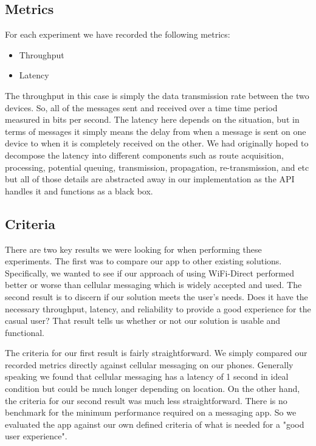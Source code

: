 \documentclass[10pt]{article}
\begin{document}
\subsection{Metrics}

For each experiment we have recorded the following metrics:
\begin{itemize}
    \item Throughput
    \item Latency
\end{itemize}
The throughput in this case is simply the data transmission rate between the two devices. So, all of the messages sent and received over a time time period measured in bits per second. The latency here depends on the situation, but in terms of messages it simply means the delay from when a message is sent on one device to when it is completely received on the other. We had originally hoped to decompose the latency into different components such as route acquisition, processing, potential queuing, transmission, propagation, re-transmission, and etc but all of those details are abstracted away in our implementation as the API handles it and functions as a black box.

\subsection{Criteria}

There are two key results we were looking for when performing these experiments. The first was to compare our app to other existing solutions. Specifically, we wanted to see if our approach of using WiFi-Direct performed better or worse than cellular messaging which is widely accepted and used. The second result is to discern if our solution meets the user's needs. Does it have the necessary throughput, latency, and reliability to provide a good experience for the casual user? That result tells us whether or not our solution is usable and functional.

The criteria for our first result is fairly straightforward. We simply compared our recorded metrics directly against cellular messaging on our phones. Generally speaking we found that cellular messaging has a latency of 1 second in ideal condition but could be much longer depending on location. On the other hand, the criteria for our second result was much less straightforward. There is no benchmark for the minimum performance required on a messaging app. So we evaluated the app against our own defined criteria of what is needed for a "good user experience".
\end{document}

